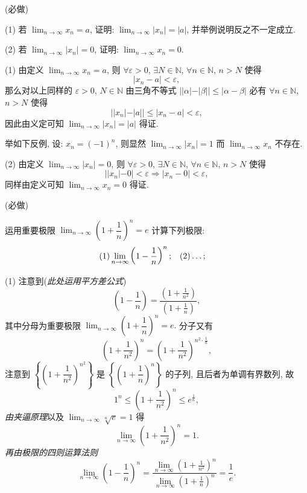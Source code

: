 \documentclass[answers, 10pt]{exam}
\begin{document}
\begin{questions}
	
	 (必做)
	
	(1) 若 $\displaystyle \lim_{n\to\infty} x_n=a$, 证明: $\displaystyle \lim_{n\to\infty} |x_n|=|a|$, 并举例说明反之不一定成立.
	
	(2) 若 $\displaystyle \lim_{n\to\infty} |x_n|=0$, 证明: $\displaystyle \lim_{n\to\infty} x_n=0$.
	
	\begin{solution}
		(1) 由定义 $\displaystyle \lim_{n\to\infty} x_n=a$, 则 $\forall \varepsilon>0$, $\exists N\in\mathbb{N}$, $\forall n\in\mathbb{N}$, $n>N$ 使得
		$$
		|x_n-a|<\varepsilon,
		$$
		那么对以上同样的 $\varepsilon>0$, $N\in\mathbb{N}$ 由三角不等式 $||\alpha|-|\beta||\le|\alpha-\beta|$ 必有 $\forall n\in\mathbb{N}$, $n>N$ 使得
		$$
		||x_n|-|a||\le|x_n-a|<\varepsilon,
		$$
		因此由义定可知 $\displaystyle \lim_{n\to\infty} |x_n|=|a|$ 得证.
		
		\smallskip
		举如下反例, 设: $x_n=(-1)^n$, 则显然 $\displaystyle \lim_{n\to\infty} |x_n|=1$ 而 $\displaystyle \lim_{n\to\infty} x_n$ 不存在.
		
		(2) 由定义 $\displaystyle \lim_{n\to\infty} |x_n|=0$, 则 $\forall \varepsilon>0$, $\exists N\in\mathbb{N}$, $\forall n\in\mathbb{N}$, $n>N$ 使得
		$$
		||x_n|-0|<\varepsilon \Rightarrow |x_n-0|<\varepsilon,
		$$
		同样由定义可知 $\displaystyle \lim_{n\to\infty} x_n=0$ 得证.
	\end{solution}
	
	 (必做)
	
	运用重要极限
	$
	\displaystyle \lim_{n\to\infty} \left(1+\dfrac1{n}\right)^n = e
	$
	计算下列极限: \vspace{-0.5ex}
	$$
	\begin{aligned}
		& (1) \lim_{n\to\infty} \left(1-\frac1{n}\right)^n;
		&&(2) \ldots;
	\end{aligned} \vspace{-5ex}
	$$	
	\begin{solution}
		(1) 注意到({\it 此处运用平方差公式})
		$$
		\left(1-\frac1{n}\right) = \frac{\left(1+\frac1{n^2}\right)}{\left(1+\frac1{n}\right)},
		$$
		其中分母为重要极限
		$
		\displaystyle \lim_{n\to\infty} \left(1+\dfrac1{n}\right)^n = e.
		$
		分子又有
		$$
		\left(1+\frac1{n^2}\right)^n = \left(1+\frac1{n^2}\right)^{n^2\cdot\frac1{n}},
		$$
		注意到 $\left\{\left(1+\dfrac1{n^2}\right)^{n^2}\right\}$ 是 $\left\{\left(1+\dfrac1{n}\right)^{n}\right\}$ 的子列, 且后者为单调有界数列, 故
		$$
		1^n\le\left(1+\frac1{n^2}\right)^n\le e^{\frac1{n}},
		$$
		{\it 由夹逼原理}以及
		$
		\displaystyle \lim_{n\to\infty} \sqrt[n]{e} = 1
		$
		得
		$$
		\lim_{n\to\infty} \left(1+\dfrac1{n^2}\right)^n = 1.
		$$
		{\it 再由极限的四则运算法则}
		$$
		\lim_{n\to\infty} \left(1-\frac1{n}\right)^n = \frac{\displaystyle \lim_{n\to\infty} \left(1+\frac1{n^2}\right)^n}{\displaystyle \lim_{n\to\infty} \left(1+\frac1{n}\right)^n} = \frac1{e}.
		$$		
	\end{solution}
	
\end{questions}
\end{document}
